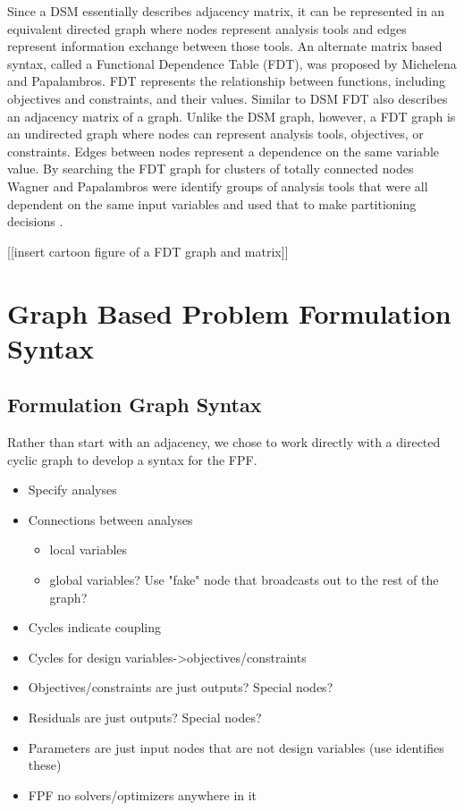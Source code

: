 \documentclass[]{aiaa-tc} %
\begin{document}
    Since a DSM essentially describes adjacency matrix, it can be represented in an equivalent directed graph where nodes represent analysis tools and 
    edges represent information exchange between those tools. An alternate matrix based syntax, called a 
    Functional Dependence Table (FDT), was proposed by Michelena and Papalambros. 
    FDT represents the relationship between functions, including objectives and constraints, and their values\cite{Michelena1997}. Similar to DSM
    FDT also describes an adjacency matrix of a graph. Unlike the DSM graph, however, a FDT graph is an undirected 
    graph where nodes can represent analysis tools, objectives, or constraints. Edges between nodes represent a dependence on the same 
    variable value. By searching the FDT graph for clusters of totally connected nodes Wagner and Papalambros were identify groups of 
    analysis tools that were all dependent on the same input variables and used that to make partitioning decisions \cite{Wagner1993}. 

    [[insert cartoon figure of a FDT graph and matrix]]

\section{Graph Based Problem Formulation Syntax}
    \subsection{Formulation Graph Syntax}
    Rather than start with an adjacency, we chose to work directly with a directed cyclic graph to develop a syntax for the FPF. 
    \begin{itemize}
        \item Specify analyses
        \item Connections between analyses 
            \begin{itemize}
                \item local variables
                \item global variables? Use "fake" node that broadcasts out to the rest of the graph? 
            \end{itemize}
        \item Cycles indicate coupling
        \item Cycles for design variables->objectives/constraints
        \item Objectives/constraints are just outputs? Special nodes? 
        \item Residuals are just outputs? Special nodes? 
        \item Parameters are just input nodes that are not design variables (use identifies these)
        \item FPF no solvers/optimizers anywhere in it
    \end{itemize}
\end{document}
